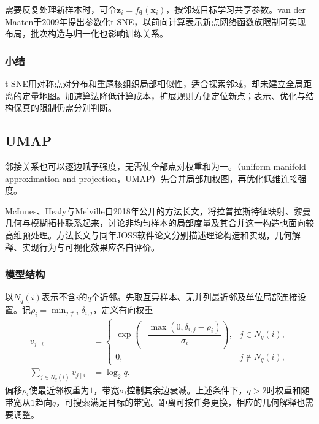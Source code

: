 需要反复处理新样本时，可令$\bm{z}_i=f_{\bm{\theta}}(\bm{x}_i)$，按邻域目标学习共享参数。van der Maaten于2009年提出参数化t-SNE，以前向计算表示新点网络函数族限制可实现布局，批次构造与归一化也影响训练关系。

\subsubsection{小结}

t-SNE用对称点对分布和重尾核组织局部相似性，适合探索邻域，却未建立全局距离的定量地图。加速算法降低计算成本，扩展规则方便定位新点；表示、优化与结构保真的限制仍需分别判断。

\subsection{UMAP}
\label{sec:dim-umap}

邻接关系也可以逐边赋予强度，无需使全部点对权重和为一。（uniform manifold approximation and projection，UMAP）先合并局部加权图，再优化低维连接强度。

McInnes、Healy与Melville自2018年公开的方法长文，将拉普拉斯特征映射、黎曼几何与模糊拓扑联系起来，讨论非均匀样本的局部度量及其合并这一构造也面向较高维预处理。方法长文与同年JOSS软件论文分别描述理论构造和实现，几何解释、实现行为与可视化效果应各自评价。

\subsubsection{模型结构}

以$N_q(i)$表示不含$i$的$q$个近邻。先取互异样本、无并列最近邻及单位局部连接设置。记$\rho_i=\min_{j\ne i}\delta_{i,j}$，定义有向权重
\begin{equation}
  \label{eq:dim-umap-directed}
  \begin{aligned}
    v_{j\mid i}
      &=
      \begin{cases}
        \exp\!\left(-\dfrac{\max(0,\delta_{i,j}-\rho_i)}
        {\sigma_i}\right),&j\in N_q(i),\\
        0,&j\notin N_q(i),
      \end{cases}\\
    \sum_{j\in N_q(i)}v_{j\mid i}&=\log_2 q.
  \end{aligned}
\end{equation}
偏移$\rho_i$使最近邻权重为$1$，带宽$\sigma_i$控制其余边衰减。上述条件下，$q>2$时权重和随带宽从$1$趋向$q$，可搜索满足目标的带宽。距离可按任务更换，相应的几何解释也需要调整。

